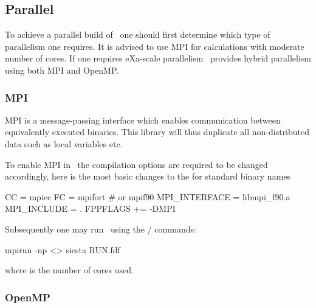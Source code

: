 


\subsection{Parallel}
\label{sec:parallel}

To achieve a parallel build of \siesta\ one should first determine
which type of parallelism one requires. It is advised to use MPI for
calculations with moderate number of cores. If one requires eXa-scale
parallelism \siesta\ provides hybrid parallelism using both MPI and
OpenMP. 


\subsubsection{MPI}

MPI is a message-passing interface which enables communication between
equivalently executed binaries. This library will thus duplicate all
non-distributed data such as local variables etc. 

To enable MPI in \siesta\ the compilation options are required to be
changed accordingly, here is the most basic changes to the
 for standard binary names
\begin{shellexample}
  CC = mpicc
  FC = mpifort # or mpif90
  MPI_INTERFACE = libmpi_f90.a
  MPI_INCLUDE = .
  FPPFLAGS += -DMPI
\end{shellexample}


Subsequently one may run \siesta\ using the
/ commands:
\begin{shellexample}
  mpirun -np <> siesta RUN.fdf
\end{shellexample}
where \shell{<>} is the number of cores used.


\subsubsection{OpenMP}


